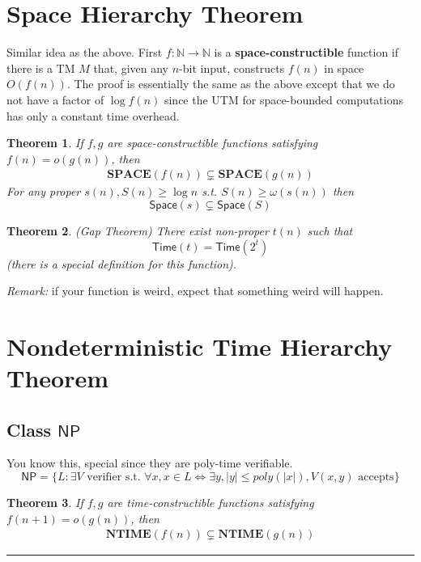 \documentclass[twoside]{article}
\newcounter{lecnum}
\newtheorem{theorem}{Theorem}[lecnum]
\newenvironment{proof}{{\bf Proof:}}{\hfill\rule{2mm}{2mm}}
\def\N{\mathbb{N}}
\begin{document}
\section{Space Hierarchy Theorem}
Similar idea as the above. First $f: \N \rightarrow \N$ is a \textbf{space-constructible} function if there is a TM $M$ that, given any $n$-bit input, constructs $f(n)$ in space $O(f(n))$. The proof is essentially the same as the above except that we do not have a factor of $\log f(n)$ since the UTM for space-bounded computations has only a constant time overhead. 
\begin{theorem}
If $f, g$ are space-constructible functions satisfying $f(n) = o(g(n))$, then 
\begin{align}
\mathbf{SPACE}(f(n)) \subsetneq \mathbf{SPACE}(g(n)) \label{DistinguishSpace}
\end{align}
For any proper $s(n), S(n) \geq \log n$ s.t. $S(n) \geq \omega(s(n))$ then 
\[\mathsf{Space}(s) \subsetneq \mathsf{Space}(S)\]
\end{theorem}

\begin{theorem}
(Gap Theorem) There exist non-proper $t(n)$ such that 
\[\mathsf{Time}(t) = \mathsf{Time}(2^t)\]
(there is a special definition for this function). 
\end{theorem}
\emph{Remark:} if your function is weird, expect that something weird will happen. 

\section{Nondeterministic Time Hierarchy Theorem}

\subsection{Class $\mathsf{NP}$}
You know this, special since they are poly-time verifiable. 
\[\mathsf{NP} = \{L: \exists V \mbox{ verifier s.t. } \forall x, x \in L \iff \exists y, |y| \leq poly(|x|), V(x,y) \mbox{ accepts}\}\]

\begin{theorem}
If $f, g$ are time-constructible functions satisfying $f(n+1) = o(g(n))$, then 
\begin{align}
\mathbf{NTIME}(f(n)) \subsetneq \mathbf{NTIME}(g(n)) \label{DistinguishNTime}
\end{align}
\end{theorem}
\begin{proof}

\end{proof}
\end{document}
